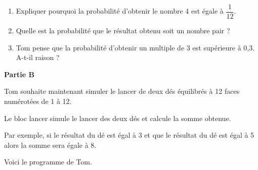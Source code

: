 \documentclass[11pt]{article}
\begin{document}

\begin{enumerate}
\item Expliquer pourquoi la probabilité d'obtenir le nombre 4 est égale à $\dfrac{1}{12}$.
\item Quelle est la probabilité que le résultat obtenu soit un nombre pair ?
\item Tom pense que la probabilité d'obtenir un multiple de 3 est supérieure à 0,3. A-t-il raison ?
\end{enumerate}

\bigskip

\textbf{Partie B}

\medskip

Tom souhaite maintenant simuler le lancer de deux dés équilibrés à 12 faces numérotées de 1 à 12.

Le bloc \og lancer \fg{} simule le lancer des deux dés et calcule la somme obtenue.

Par exemple, si le résultat du dé  est égal à 3 et que le résultat du dé  est égal à 5 alors la somme sera égale à 8.

Voici le programme de Tom.
\end{document}
